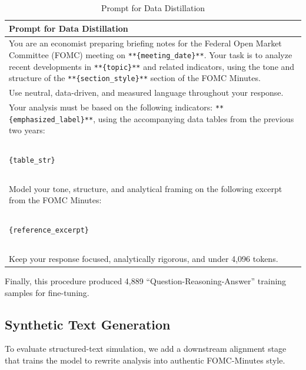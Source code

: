 \begin{table}[htbp]
    \centering
    \footnotesize
    \begin{tabular}{p{}}
    \toprule
    \textbf{Prompt for Data Distillation} \\
    \midrule
You are an economist preparing briefing notes for the Federal Open Market Committee (FOMC) meeting on \texttt{**\{meeting\_date\}**}.  
Your task is to analyze recent developments in \texttt{**\{topic\}**} and related indicators, using the tone and structure of the \texttt{**\{section\_style\}**} section of the FOMC Minutes. \\

Use neutral, data-driven, and measured language throughout your response. \\

Your analysis must be based on the following indicators: \texttt{**\{emphasized\_label\}**}, using the accompanying data tables from the previous two years: \\

~\\
\texttt{\{table\_str\}} \\
~\\


Model your tone, structure, and analytical framing on the following excerpt from the FOMC Minutes:\\

~\\
\texttt{\{reference\_excerpt\}} \\
~\\

Keep your response focused, analytically rigorous, and under 4,096 tokens. \\
    \bottomrule
    \end{tabular}
    \caption{Prompt for Data Distillation}
    \label{tab:ch2:prompt_for_data_distillation}
\end{table}


Finally, this procedure produced 4,889 ``Question-Reasoning-Answer'' training samples for fine-tuning.




\subsection*{Synthetic Text Generation}


To evaluate structured-text simulation, we add a downstream alignment stage that trains the model to rewrite analysis into authentic FOMC-Minutes style.


